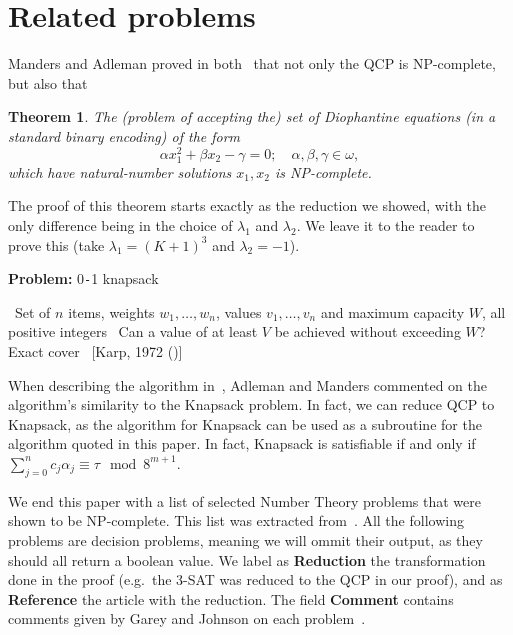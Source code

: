 \documentclass{amsart}
\theoremstyle{plain}
\newtheorem{theorem}{Theorem}
\begin{document}
\section{Related problems}

Manders and Adleman proved in both~\cite{qcp1,qcp2} that not only the QCP is NP-complete, but also
that

\begin{theorem}\label{diophantine-thm}
  The (problem of accepting the) set of Diophantine equations (in a standard binary encoding) of
  the form
  \begin{equation*}
    \alpha x_1^2+\beta x_2-\gamma=0;\quad\alpha,\beta,\gamma\in\omega,
  \end{equation*}
  which have natural-number solutions $x_1,x_2$ is NP-complete.
\end{theorem}

The proof of this theorem starts exactly as the reduction we showed, with the only difference being
in the choice of $\lambda_1$ and $\lambda_2$. We leave it to the reader to prove this (take
$\lambda_1={(K+1)}^3$ and $\lambda_2=-1$).

\begin{algorithm}[h]
  \caption*{\textbf{Problem:} 0\texttt{-}1 knapsack}
  \begin{algorithmic}[1]
    \Require\, Set of $n$ items, weights $w_1,\ldots,w_n$, values $v_1,\ldots,v_n$ and maximum
    capacity $W$, all positive integers
    \Description\, Can a value of at least $V$ be achieved without exceeding $W$?
    \Reduction\, Exact cover
    \Reference\, [Karp, 1972 (\cite{karp})]
  \end{algorithmic}
\end{algorithm}

When describing the algorithm in~\cite{qcp2}, Adleman and Manders commented on the algorithm's
similarity to the Knapsack problem. In fact, we can reduce QCP to Knapsack, as the algorithm for
Knapsack can be used as a subroutine for the algorithm quoted in this paper. In fact, Knapsack is
satisfiable if and only if $\sum_{j=0}^n c_j\alpha_j\equiv\tau\mod 8^{m+1}$.

We end this paper with a list of selected Number Theory problems that were shown to be NP-complete.
This list was extracted from~\cite{garey-johnson}. All the following problems are decision
problems, meaning we will ommit their output, as they should all return a boolean value.  We label
as \textbf{Reduction} the transformation done in the proof (e.g.\ the 3-SAT was reduced to the QCP
in our proof), and as \textbf{Reference} the article with the reduction. The field \textbf{Comment}
contains comments given by Garey and Johnson on each problem~\cite{garey-johnson}.
\end{document}
